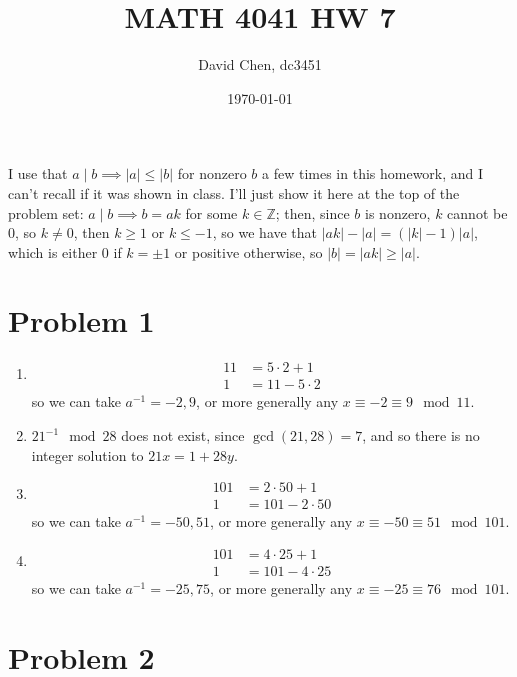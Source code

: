 \documentclass[12pt,letterpaper]{article}
\title{MATH 4041 HW 7}
\author{David Chen, dc3451}
\date{\today}
\theoremstyle{definition}
\newcommand{\Z}{\mathbb{Z}}
\begin{document}
\maketitle

I use that $a \mid b \implies |a| \leq |b|$ for nonzero $b$ a few times in this homework, and I can't recall if it was shown in class. I'll just show it here at the top of the problem set: $a \mid b \implies b = ak$ for some $k \in \Z$; then, since $b$ is nonzero, $k$ cannot be $0$, so $k \neq 0$, then $k \geq 1$ or $k \leq -1$, so we have that $|ak| - |a| = (|k| - 1)|a|$, which is either $0$ if $k = \pm 1$ or positive otherwise, so $|b| = |ak| \geq |a|$.

\section*{Problem 1}

\begin{enumerate}
  \item \begin{align*}
          11 &= 5 \cdot 2 + 1 \\
          1 &= 11 - 5 \cdot 2
        \end{align*}
        so we can take $a^{-1} = -2, 9$, or more generally any $x \equiv -2 \equiv 9 \mod 11$.

  \item $21^{-1} \mod 28$ does not exist, since $\gcd(21, 28) = 7$, and so there is no integer solution to $21x = 1 + 28y$.

  \item \begin{align*}
          101 &= 2 \cdot 50 + 1 \\
          1 &= 101 - 2 \cdot 50
        \end{align*}
        so we can take $a^{-1} = -50, 51$, or more generally any $x \equiv -50 \equiv 51 \mod 101$.

  \item \begin{align*}
          101 &= 4 \cdot 25 + 1 \\
          1 &= 101 - 4 \cdot 25
        \end{align*}
        so we can take $a^{-1} = -25, 75$, or more generally any $x \equiv -25 \equiv 76 \mod 101$.
\end{enumerate}

\section*{Problem 2}
\end{document}
